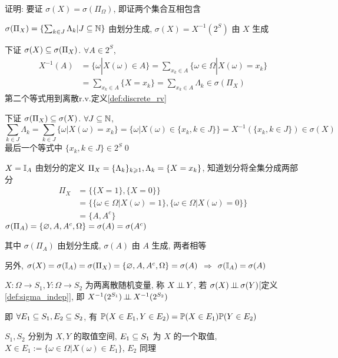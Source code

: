 证明: 要证 $\sigma(X)=\sigma(\Pi_{\Omega})$, 即证两个集合互相包含

$\sigma(\Pi_X)=\{\sum_{k\in J}\Lambda_k|J\subseteq \mathbb{N}\}$ 由划分生成, $\sigma(X)=X^{-1}(2^S)$ 由 $X$ 生成

下证 $\sigma(X)\subseteq \sigma(\Pi_X)$. $\forall A\in 2^S$,
\[
\begin{aligned}
     X^{-1}(A)&=\{\omega|X(\omega)\in A\}=\sum_{x_k\in A}\{\omega\in \Omega|X(\omega)=x_k\}\\
    &=\sum_{x_k\in A}\{X=x_k\}=\sum_{x_k\in A} \Lambda_k \in \sigma(\Pi_X)
\end{aligned}
\]
第二个等式用到离散r.v.定义\ref{def:discrete_rv}

下证 $\sigma(\Pi_X)\subseteq \sigma(X)$. $\forall J\subseteq \mathbb{N}$,
\[
\sum_{k\in J}\Lambda_k=\sum_{k\in J}\{\omega|X(\omega)=x_k\}=\{\omega|X(\omega)\in \{x_k,k\in J\}\}=X^{-1}(\{x_k,k\in J\})\in \sigma(X)
\]
最后一个等式中 $\{x_k,k\in J\}\in 2^S$\qed

\begin{example}\label{exa:indicator_sigma}
    $X=\mathbb I_A$ 由划分的定义 $\Pi_X=\{{\Lambda}_{k}\}_{k \geqslant 1}, \Lambda_k=\{X=x_k\}$, 知道划分将全集分成两部分 
    \[
    \begin{aligned}
        \Pi_{X}&=\{\{X=1\},\{X=0\}\}\\
        &=\{\{\omega\in \Omega|X(\omega)=1\}, \{\omega\in \Omega|X(\omega)=0\}\}\\
        &=\{A, A^c\}
    \end{aligned}
    \]
    $\sigma(\Pi_A)=\{\varnothing, A,A^c, \Omega\}=\sigma(A)=\sigma(A^c)$

    其中 $\sigma(\Pi_A)$ 由划分生成, $\sigma(A)$ 由 $A$ 生成, 两者相等

    另外, $\sigma(X)=\sigma(\mathbb I_A)=\sigma(\Pi_X)=\{\varnothing, A,A^c, \Omega\}=\sigma(A)$ $\Rightarrow$ $\sigma(\mathbb I_A)=\sigma(A)$
\end{example}

\begin{definition}[离散随机变量间的独立性]\label{def:discrete_rv_indep}
    $X:\Omega\rightarrow S_1, Y:\Omega\rightarrow S_2$ 为两离散随机变量, 称 $X\operatorname{\perp\!\!\!\perp} Y$, 若 $\sigma(X)\operatorname{\perp\!\!\!\perp} \sigma(Y)$[定义\ref{def:sigma_indep}], 即 $X^{-1}(2^{S_1})\operatorname{\perp\!\!\!\perp} X^{-1}(2^{S_2})$

    即 $\forall E_1\subseteq S_1,E_2\subseteq S_2$, 有 $\mathbb{P}(X\in E_1,Y\in E_2)=\mathbb{P}(X\in E_1)\mathbb{P}(Y\in E_2)$
\end{definition}

$S_1,S_2$ 分别为 $X,Y$ 的取值空间, $E_1\subseteq S_1$ 为 $X$ 的一个取值, $X\in E_1:=\{\omega\in \Omega|X(\omega)\in E_1\}$, $E_2$ 同理

